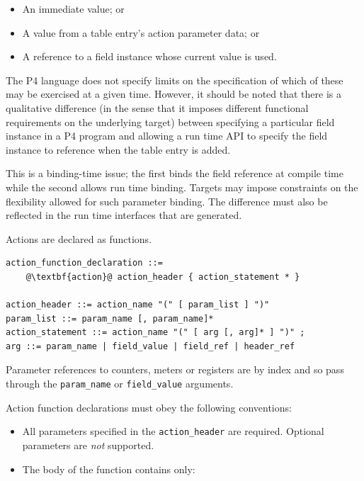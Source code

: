 \documentclass[12pt]{article}
\begin{document}
\begin{itemize}
\item
An immediate value; or
\item
A value from a table entry's action parameter data; or
\item
A reference to a field instance whose current value is used.
\end{itemize}


The P4 language does not specify limits on the specification of which of these 
may be exercised at a given time. However, it should be noted that there is 
a qualitative difference (in the sense that it imposes different functional 
requirements on the underlying target) between specifying a particular field 
instance in a P4 program and allowing a run time API to specify the field 
instance to reference when the table entry is added. 

This is a binding-time issue; the first binds the field reference at compile 
time while the second allows run time binding. Targets may impose constraints 
on the flexibility allowed for such parameter binding. The difference must 
also be reflected in the run time interfaces that are generated.


Actions are declared as functions.

\begin{lstlisting}[frame=single,backgroundcolor=\color{bnfgreen},escapechar=\@]
action_function_declaration ::=
    @\textbf{action}@ action_header { action_statement * }

action_header ::= action_name "(" [ param_list ] ")"
param_list ::= param_name [, param_name]*
action_statement ::= action_name "(" [ arg [, arg]* ] ")" ;
arg ::= param_name | field_value | field_ref | header_ref
\end{lstlisting}

Parameter references to counters, meters or registers are by index and so 
pass through the \texttt{param_name} or \texttt{field_value} arguments.

Action function declarations must obey the following conventions:

\begin{itemize}
\item
All parameters specified in the \texttt{action_header} are required. Optional parameters 
are \textit{not} supported.
\item
The body of the function contains only:
\end{itemize}
\end{document}
